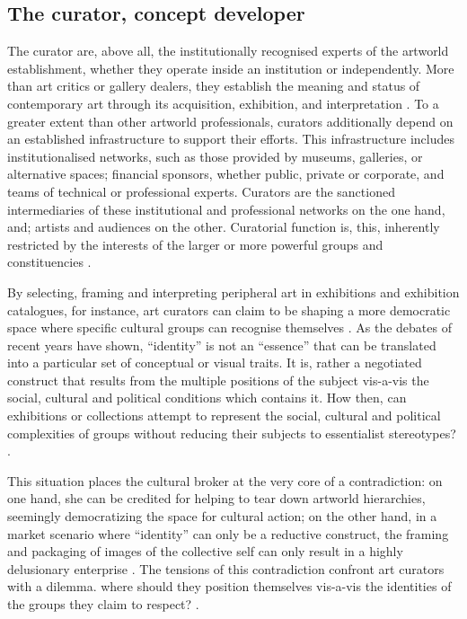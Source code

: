 
\subsection{The curator, concept developer}
The curator are, above all, the institutionally recognised experts of the artworld establishment, whether they operate inside an institution or independently. More than art critics or gallery dealers, they establish the meaning and status of contemporary art through its acquisition, exhibition, and interpretation \autocite[p. 22]{Thi_book}. To a greater extent than other artworld professionals, curators additionally depend on an established infrastructure to support their efforts. This infrastructure includes institutionalised networks, such as those provided by museums, galleries, or alternative spaces; financial sponsors, whether public, private or corporate, and teams of technical or professional experts. Curators are the sanctioned intermediaries of these institutional and professional networks on the one hand, and; artists and audiences on the other. Curatorial function is, this, inherently restricted by the interests of the larger or more powerful groups and constituencies \autocite[p. 22]{Thi_book}.

By selecting, framing and interpreting peripheral art in exhibitions and exhibition catalogues, for instance, art curators can claim to be shaping a more democratic space where specific cultural groups can recognise themselves \autocite[p. 23]{Thi_book}. As the debates of recent years have shown, “identity” is not an “essence” that can be translated into a particular set of conceptual or visual traits. It is, rather a negotiated construct that results from the multiple positions of the subject vis-a-vis the social, cultural and political conditions which contains it. How then, can exhibitions or collections attempt to represent the social, cultural and political complexities of groups without reducing their subjects to essentialist stereotypes? \autocite[p. 23]{Thi_book}.

This situation places the cultural broker at the very core of a contradiction: on one hand, she can be credited for helping to tear down artworld hierarchies, seemingly democratizing the space for cultural action; on the other hand, in a market scenario where “identity” can only be a reductive construct, the framing and packaging of images of the collective self can only result in a highly delusionary enterprise \autocite[p. 23-24]{Thi_book}. The tensions of this contradiction confront art curators with a dilemma. where should they position themselves vis-a-vis the identities of the groups they claim to respect? \autocite[p. 24]{Thi_book}.

